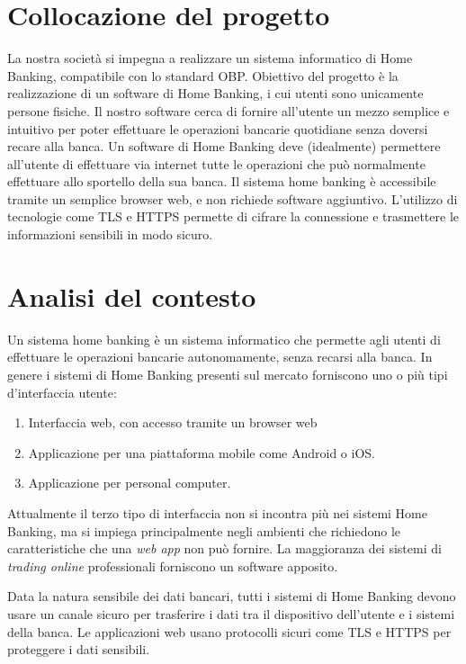 \documentclass[10pt]{softeng} %
\begin{document}
\startofdocument{}

\section{Collocazione del progetto}

La nostra societ\`a si impegna a realizzare un sistema informatico di Home Banking, compatibile con lo standard OBP.
Obiettivo del progetto \`e la realizzazione di un software di Home Banking, i cui utenti sono unicamente persone fisiche.
Il nostro software cerca di fornire all'utente un mezzo semplice e intuitivo per poter effettuare le operazioni bancarie quotidiane senza doversi recare alla banca.
Un software di Home Banking deve (idealmente) permettere all'utente di effettuare via internet tutte le operazioni che pu\`o normalmente effettuare allo sportello della sua banca.
Il sistema home banking \`e accessibile tramite un semplice browser web, e non richiede software aggiuntivo.
L'utilizzo di tecnologie come TLS e HTTPS permette di cifrare la connessione e trasmettere le informazioni sensibili in modo sicuro.


\section{Analisi del contesto}
Un sistema home banking \`e un sistema informatico che permette agli utenti di effettuare le operazioni bancarie autonomamente, senza recarsi alla banca.
In genere i sistemi di Home Banking presenti sul mercato forniscono uno o pi\`u tipi d'interfaccia utente:
\begin{enumerate}
    \item Interfaccia web, con accesso tramite un browser web
    \item Applicazione per una piattaforma mobile come Android o iOS.
    \item Applicazione per personal computer.
\end{enumerate}
Attualmente il terzo tipo di interfaccia non si incontra pi\`u nei sistemi Home Banking, ma si impiega principalmente negli ambienti che richiedono le caratteristiche che una \emph{web app} non pu\`o fornire.
La maggioranza dei sistemi di \emph{trading online} professionali forniscono un software apposito.


Data la natura sensibile dei dati bancari, tutti i sistemi di Home Banking devono usare un canale sicuro per trasferire i dati tra il dispositivo dell'utente e i sistemi della banca.
Le applicazioni web usano protocolli sicuri come TLS e HTTPS per proteggere i dati sensibili.
\end{document}
